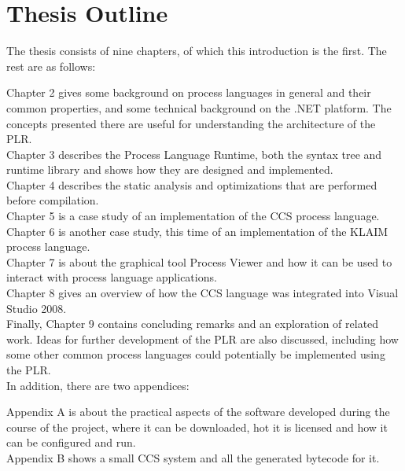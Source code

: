 \section{Thesis Outline}

	The thesis consists of nine chapters, of which this introduction is the 
	first. The rest are as follows:

	Chapter 2 gives some background on process languages in general and their 
	common properties, and some technical background on the .NET platform. The 
	concepts presented there are useful for understanding the architecture of 
	the PLR.\\
	Chapter 3 describes the Process Language Runtime, both the syntax tree and 
	runtime library and shows how they are designed and implemented. \\
	Chapter 4 describes the static analysis and optimizations that are performed
	before compilation.\\
	Chapter 5 is a case study of an implementation of the CCS process 
	language.\\
	Chapter 6 is another case study, this time of an implementation of the 
	KLAIM process language.\\
	Chapter 7 is about the graphical tool Process Viewer and how it can be used
	to interact with process language applications.\\
	Chapter 8 gives an overview of how the CCS language was integrated into 
	Visual Studio 2008. \\
	Finally, Chapter 9 contains concluding remarks and an exploration of related 
	work. Ideas for further development of the PLR are also discussed, including 
	how some other common process languages could potentially be implemented 
	using the PLR.\\
 
	In addition, there are two appendices:
	
	Appendix A is about the practical aspects of the software developed during 
	the course of the project, where it can be downloaded, hot it is licensed 
	and how it can be configured and run.\\
	Appendix B shows a small CCS system and all the generated bytecode for it.